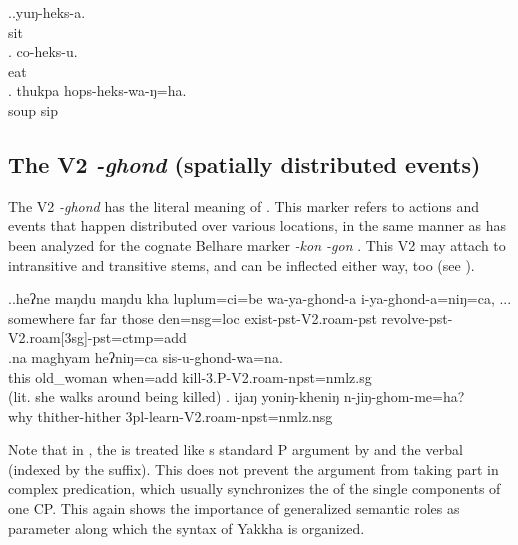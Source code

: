 \ex.\ag.yuŋ-heks-a.\\
sit\\
\bg. co-heks-u.\\
eat\\
\bg. thukpa hops-heks-wa-ŋ=ha.\\
soup sip\\


	
\subsection{The V2 \emph{-ghond} (spatially distributed events)}\label{V2-roam}%


The V2 \emph{-ghond} has the literal meaning of . This marker refers to actions and events that happen distributed over various locations, in the same manner as has been analyzed for the cognate Belhare marker \emph{-kon \ti -gon} \citep[163]{Bickel1996Aspect}. This V2 may attach to intransitive and transitive stems, and can be inflected either way, too (see \Next).


\ex.\ag.heʔne  maŋdu maŋdu kha luplum=ci=be           wa-ya-ghond-a             i-ya-ghond-a=niŋ=ca, ...\\
somewhere far far those den{\sc =nsg=loc} exist{\sc -pst-V2.roam-pst} revolve{\sc -pst-V2.roam[3sg]-pst=ctmp=add}\\
 
\bg.na maghyam heʔniŋ=ca sis-u-ghond-wa=na.\\
	this old\_woman when{\sc =add} kill{\sc -3.P-V2.roam-npst=nmlz.sg}		\\
	 (lit. she walks around being killed) 
\bg.	ijaŋ yoniŋ-kheniŋ     n-jiŋ-ghom-me=ha?\\
why thither-hither {\sc 3pl-}learn{\sc -V2.roam-npst=nmlz.nsg}\\


Note that in \Last[b], the  is treated like s standard P argument  by  and the verbal  (indexed by the  suffix). This does not prevent the  argument from taking part in complex predication, which usually synchronizes the  of the single components of one CP. This again shows the importance of generalized semantic roles as parameter along which the syntax of Yakkha is organized. 

